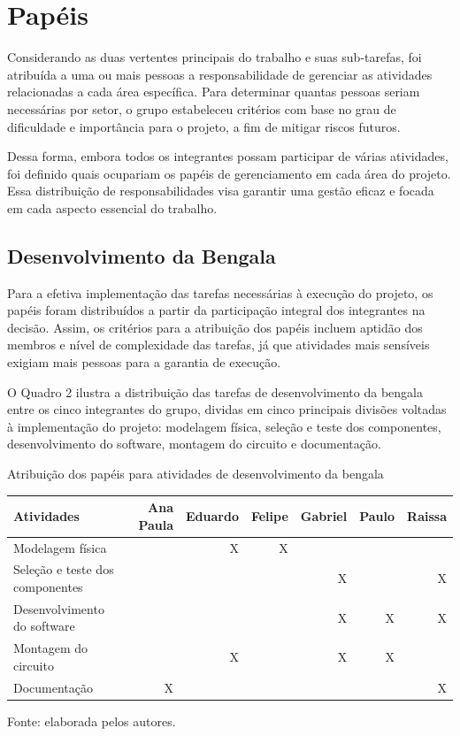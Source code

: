     \section{Papéis}
    
    Considerando as duas vertentes principais do trabalho e suas sub-tarefas, foi atribuída a uma ou mais pessoas a responsabilidade de gerenciar as atividades relacionadas a cada área específica. Para determinar quantas pessoas seriam necessárias por setor, o grupo estabeleceu critérios com base no grau de dificuldade e importância para o projeto, a fim de mitigar riscos futuros.
    
    Dessa forma, embora todos os integrantes possam participar de várias atividades, foi definido quais ocupariam os papéis de gerenciamento em cada área do projeto. Essa distribuição de responsabilidades visa garantir uma gestão eficaz e focada em cada aspecto essencial do trabalho.

    \subsection{Desenvolvimento da Bengala}

    Para a efetiva implementação das tarefas necessárias à execução do projeto, os papéis foram distribuídos a partir da participação integral dos integrantes na decisão. Assim, os critérios para a atribuição dos papéis incluem aptidão dos membros e nível de complexidade das tarefas, já que atividades mais sensíveis exigiam mais pessoas para a garantia de execução.
    
    O Quadro 2 ilustra a distribuição das tarefas de desenvolvimento da bengala entre os cinco integrantes do grupo, dividas em cinco principais divisões voltadas à implementação do projeto: modelagem física, seleção e teste dos componentes, desenvolvimento do software, montagem do circuito e documentação.
    
        \begin{quadro}[!ht]    
            \captionsetup{width=1.0\textwidth} %
            \caption{Atribuição dos papéis para atividades de desenvolvimento da bengala}    
            \begin{tabular}{lrrrrrr}
                \toprule
                Atividades & Ana Paula & Eduardo & Felipe & Gabriel & Paulo & Raissa \\
                \midrule
                Modelagem física                        &   & X & X &   &   &   \\
                Seleção e teste dos componentes         &   &   &   & X &   & X \\
                Desenvolvimento do software             &   &   &   & X & X & X \\
                Montagem do circuito                    &   & X &   & X & X &   \\
                Documentação                            & X &   &   &   &   & X \\
                \bottomrule
            \end{tabular}
            \caption*{Fonte: elaborada pelos autores.} %
        \end{quadro}

